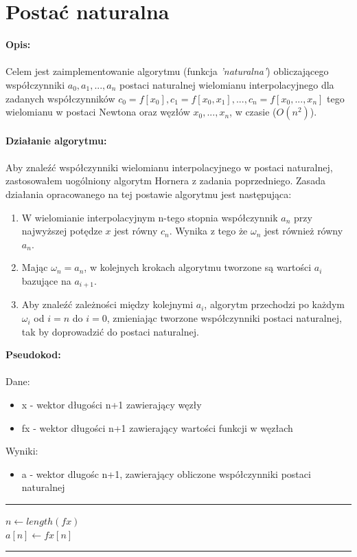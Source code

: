 \documentclass{article}
\begin{document}
\section*{Postać naturalna}
\noindent \textbf{Opis: } \\\\
Celem jest zaimplementowanie algorytmu (funkcja \textit{'naturalna'}) obliczającego współczynniki $a_0,a_1,...,a_n$ postaci naturalnej wielomianu interpolacyjnego dla zadanych współczynników $c_0=f[x_0],c_1=f[x_0,x_1],...,c_n=f[x_0,...,x_n]$ tego wielomianu w postaci Newtona oraz węzłów $x_0,...,x_n$, w czasie ($O(n^2)$).\\\\
\noindent \textbf{Działanie algorytmu: } \\\\
Aby znaleźć współczynniki wielomianu interpolacyjnego w postaci naturalnej, zastosowałem uogólniony algorytm Hornera z zadania poprzedniego. Zasada działania opracowanego na tej postawie algorytmu jest następująca:
\begin{enumerate}
	\item W wielomianie interpolacyjnym n-tego stopnia współczynnik $a_n$ przy najwyższej potędze $x$ jest równy $c_n$. Wynika z tego że $\omega_n$ jest również równy $a_n$.
	\item Mając $\omega_n = a_n$, w kolejnych krokach algorytmu tworzone są wartości $a_i$ bazujące na $a_{i+1}$.
	\item Aby znaleźć zależności między kolejnymi $a_i$, algorytm przechodzi po każdym $\omega_i$ od $i=n$ do $i = 0$, zmieniając tworzone współczynniki postaci naturalnej, tak by doprowadzić do postaci naturalnej.
\end{enumerate}
\noindent \textbf{Pseudokod: } \\\\
Dane:
\begin{itemize}
	\item x - wektor długości n+1 zawierający węzły
	\item fx - wektor długości n+1 zawierający wartości funkcji w węzłach
\end{itemize}
Wyniki:
\begin{itemize}
	\item a - wektor dlugośc n+1, zawierający obliczone współczynniki postaci naturalnej
\end{itemize}
\rule{\textwidth}{0.4pt}
\begin{algorithm}[H]
	\vspace{0.3cm}
	$n \gets length(fx)$\\
	$a[n] \gets fx[n]$\\
\end{algorithm}
\hrule
\vspace{0.3cm}
\newpage
\end{document}
